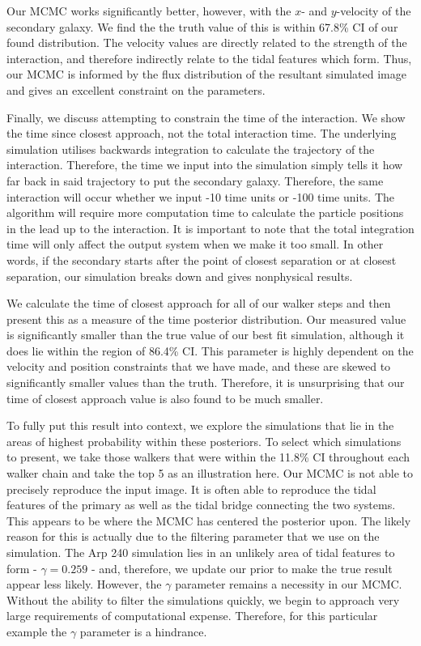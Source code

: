 Our MCMC works significantly better, however, with the $x$- and $y$-velocity of the secondary galaxy. We find the the truth value of this is within 67.8\% CI of our found distribution. The velocity values are directly related to the strength of the interaction, and therefore indirectly relate to the tidal features which form. Thus, our MCMC is informed by the flux distribution of the resultant simulated image and gives an excellent constraint on the parameters.

Finally, we discuss attempting to constrain the time of the interaction. We show the time since closest approach, not the total interaction time. The underlying simulation utilises backwards integration to calculate the trajectory of the interaction. Therefore, the time we input into the simulation simply tells it how far back in said trajectory to put the secondary galaxy. Therefore, the same interaction will occur whether we input -10 time units or -100 time units. The algorithm will require more computation time to calculate the particle positions in the lead up to the interaction. It is important to note that the total integration time will only affect the output system when we make it too small. In other words, if the secondary starts after the point of closest separation or at closest separation, our simulation breaks down and gives nonphysical results.

We calculate the time of closest approach for all of our walker steps and then present this as a measure of the time posterior distribution. Our measured value is significantly smaller than the true value of our best fit simulation, although it does lie within the region of 86.4\% CI. This parameter is highly dependent on the velocity and position constraints that we have made, and these are skewed to significantly smaller values than the truth. Therefore, it is unsurprising that our time of closest approach value is also found to be much smaller.

To fully put this result into context, we explore the simulations that lie in the areas of highest probability within these posteriors. To select which simulations to present, we take those walkers that were within the 11.8\% CI throughout each walker chain and take the top 5 as an illustration here. Our MCMC is not able to precisely reproduce the input image. It is often able to reproduce the tidal features of the primary as well as the tidal bridge connecting the two systems. This appears to be where the MCMC has centered the posterior upon. The likely reason for this is actually due to the filtering parameter that we use on the simulation. The Arp 240 simulation lies in an unlikely area of tidal features to form - $\gamma = 0.259$ - and, therefore, we update our prior to make the true result appear less likely. However, the $\gamma$ parameter remains a necessity in our MCMC. Without the ability to filter the simulations quickly, we begin to approach very large requirements of computational expense. Therefore, for this particular example the $\gamma$ parameter is a hindrance.


